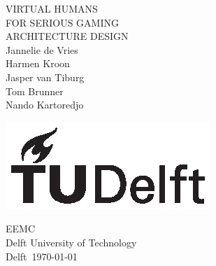 \documentclass[]{article}
\begin{document}
	
	\begin{titlepage}
		\centering
		
		{\Huge VIRTUAL HUMANS}\\[1em]
		{\huge FOR SERIOUS GAMING}\\[1em]
		{\Large ARCHITECTURE DESIGN}\\[2em]
		{Jannelie de Vries}\\
		{Harmen Kroon}\\
		{Jasper van Tiburg}\\
		{Tom Brunner}\\
		{Nando Kartoredjo}
		
		\vfill
		
		\includegraphics{TU_Delft_logo_Black.eps}
		
		EEMC\\
		Delft University of Technology\\
		Delft\
		\today		
	\end{titlepage}
	
	\tableofcontents
	\newpage
	
	

	
\end{document}
